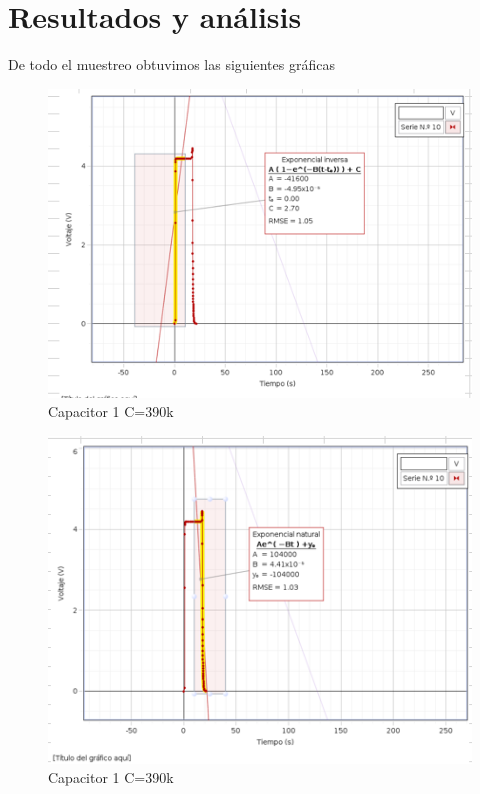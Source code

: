 \documentclass{article}
\begin{document}
\section{Resultados y análisis}\label{Resultados}			%
De todo el muestreo obtuvimos las siguientes gráficas
\begin{figure}[H]
   \centering 
   \includegraphics[scale=0.5]{../imgs/r.png}
   \caption{Capacitor 1 C=390k}
   \label{Fig:1}
\end{figure}

\begin{figure}[H]
   \centering 
   \includegraphics[scale=0.5]{../imgs/r1.png}
   \caption{Capacitor 1 C=390k}
   \label{Fig:2}
\end{figure}
\end{document}
